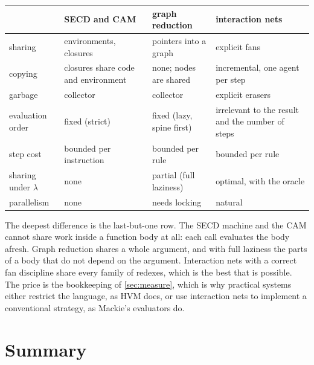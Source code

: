 \documentclass[11pt,a4paper]{article}
\theoremstyle{definition}
\theoremstyle{plain}
\begin{document}
\begin{center}
\small
\begin{tabularx}{\textwidth}{@{}l X X X@{}}
\toprule
& SECD and CAM & graph reduction & interaction nets\\
\midrule
sharing & environments, closures & pointers into a graph & explicit fans\\
copying & closures share code and environment & none; nodes are shared & incremental, one agent per step\\
garbage & collector & collector & explicit erasers\\
evaluation order & fixed (strict) & fixed (lazy, spine first) & irrelevant to the result and the number of steps\\
step cost & bounded per instruction & bounded per rule & bounded per rule\\
sharing under $\lambda$ & none & partial (full laziness) & optimal, with the oracle\\
parallelism & none & needs locking & natural\\
\bottomrule
\end{tabularx}
\end{center}

\noindent
The deepest difference is the last-but-one row. The SECD machine and the CAM
cannot share work inside a function body at all: each call evaluates the body
afresh. Graph reduction shares a whole argument, and with full laziness the
parts of a body that do not depend on the argument. Interaction nets with a
correct fan discipline share every family of redexes, which is the best that
is possible. The price is the bookkeeping of \cref{sec:measure}, which is why
practical systems either restrict the language, as HVM does, or use
interaction nets to implement a conventional strategy, as Mackie's
evaluators do.

\section{Summary}
\end{document}

